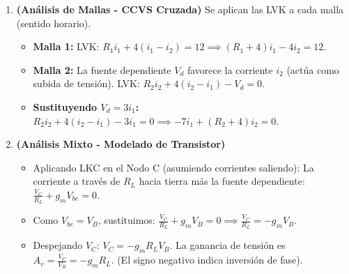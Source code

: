 \documentclass[12pt, a4paper]{article}
\begin{document}
\begin{enumerate}[leftmargin=*, itemsep=2em]
    \item \textbf{(Análisis de Mallas - CCVS Cruzada)}
    Se aplican las LVK a cada malla (sentido horario).
    \begin{itemize}
        \item \textbf{Malla 1:} LVK: $R_1 i_1 + 4(i_1 - i_2) = 12 \implies (R_1 + 4) i_1 - 4 i_2 = 12$.
        \item \textbf{Malla 2:} La fuente dependiente $V_d$ favorece la corriente $i_2$ (actúa como subida de tensión). LVK: $R_2 i_2 + 4(i_2 - i_1) - V_d = 0$.
        \item \textbf{Sustituyendo $V_d = 3 i_1$:} $R_2 i_2 + 4(i_2 - i_1) - 3 i_1 = 0 \implies -7 i_1 + (R_2 + 4) i_2 = 0$.
    \end{itemize}

    \item \textbf{(Análisis Mixto - Modelado de Transistor)}
    \begin{itemize}
        \item Aplicando LKC en el Nodo C (asumiendo corrientes saliendo): La corriente a través de $R_L$ hacia tierra más la fuente dependiente: $\frac{V_C}{R_L} + g_m V_{be} = 0$.
        \item Como $V_{be} = V_B$, sustituimos: $\frac{V_C}{R_L} + g_m V_B = 0 \implies \frac{V_C}{R_L} = -g_m V_B$.
        \item Despejando $V_C$: $V_C = -g_m R_L V_B$. La ganancia de tensión es $A_v = \frac{V_C}{V_B} = -g_m R_L$. (El signo negativo indica inversión de fase).
    \end{itemize}

\end{enumerate}
\end{document}
